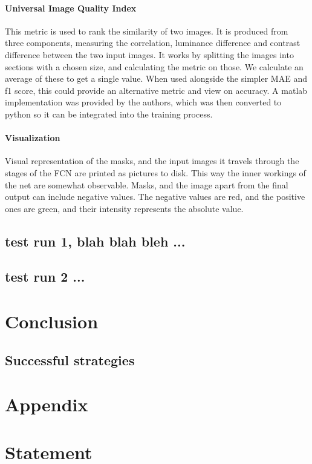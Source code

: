 \documentclass[12pt]{report}
\begin{document}
\subsubsection{Universal Image Quality Index}This metric is used to rank the similarity of two images. It is produced from three components, measuring the correlation, luminance difference and contrast difference between the two input images. It works by splitting the images into sections with a chosen size, and calculating the metric on those. We calculate an average of these to get a single value. When used alongside the simpler MAE and f1 score, this could provide an alternative metric and view on accuracy. A matlab implementation was provided by the authors, which was then converted to python so it can be integrated into the training process.
\subsubsection{Visualization}Visual representation of the masks, and the input images it travels through the stages of the FCN are printed as pictures to disk. This way the inner workings of the net are somewhat observable. Masks, and the image apart from the final output can include negative values. The negative values are red, and the positive ones are green, and their intensity represents the absolute value.
\section{test run 1, blah blah bleh ...}
\section{test run 2 ...}
\chapter{Conclusion}
\section{Successful strategies}

\chapter{Appendix}

\chapter*{Statement}
\end{document}
